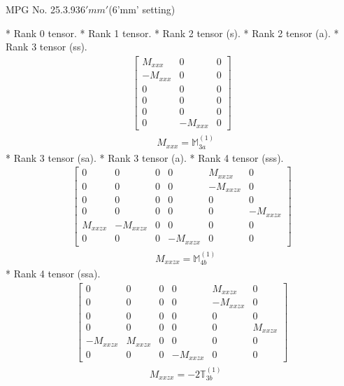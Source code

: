 \documentclass[fleqn,8pt,landscape]{jsarticle}
\begin{document}
\setcounter{MaxMatrixCols}{32}

\renewcommand{\tablename}{Table~}
\renewcommand{\figurename}{Figure~}
\begin{center}
\LARGE
MPG No. 25.3.93\quad$6'mm'$\quad(6'mm' setting)
\end{center}
* Rank 0 tensor.
* Rank 1 tensor.
* Rank 2 tensor (s).
* Rank 2 tensor (a).
* Rank 3 tensor (ss).
\begin{align*}
\begin{bmatrix} M_{xxx} & 0 & 0 \\ - M_{xxx} & 0 & 0 \\ 0 & 0 & 0 \\ 0 & 0 & 0 \\ 0 & 0 & 0 \\ 0 & - M_{xxx} & 0 \end{bmatrix}
\end{align*}
\begin{align*}
& M_{xxx} = \mathbb{M}_{3a}^{(1)}
\end{align*}
* Rank 3 tensor (sa).
* Rank 3 tensor (a).
* Rank 4 tensor (sss).
\begin{align*}
\begin{bmatrix} 0 & 0 & 0 & 0 & M_{xxzx} & 0 \\ 0 & 0 & 0 & 0 & - M_{xxzx} & 0 \\ 0 & 0 & 0 & 0 & 0 & 0 \\ 0 & 0 & 0 & 0 & 0 & - M_{xxzx} \\ M_{xxzx} & - M_{xxzx} & 0 & 0 & 0 & 0 \\ 0 & 0 & 0 & - M_{xxzx} & 0 & 0 \end{bmatrix}
\end{align*}
\begin{align*}
& M_{xxzx} = \mathbb{M}_{4b}^{(1)}
\end{align*}
* Rank 4 tensor (ssa).
\begin{align*}
\begin{bmatrix} 0 & 0 & 0 & 0 & M_{xxzx} & 0 \\ 0 & 0 & 0 & 0 & - M_{xxzx} & 0 \\ 0 & 0 & 0 & 0 & 0 & 0 \\ 0 & 0 & 0 & 0 & 0 & M_{xxzx} \\ - M_{xxzx} & M_{xxzx} & 0 & 0 & 0 & 0 \\ 0 & 0 & 0 & - M_{xxzx} & 0 & 0 \end{bmatrix}
\end{align*}
\begin{align*}
& M_{xxzx} = - 2 \mathbb{T}_{3b}^{(1)}
\end{align*}
\end{document}
